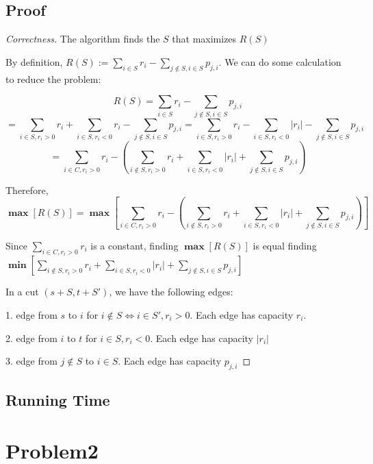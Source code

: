 \documentclass[openany]{article}
\begin{document}
\subsection*{Proof}
\begin{proof}[Correctness]{The algorithm finds the $S$ that maximizes $R(S)$}

By definition, $R(S):=\sum_{i\in S}r_i-\sum_{j\notin S, i\in S}p_{j,i}$. We can do some calculation to reduce the problem:

\[R(S) = \sum_{i\in S}r_i-\sum_{j\notin S, i\in S}p_{j,i}\]
\[= \sum_{i\in S, r_i>0}r_i + \sum_{i\in S, r_i<0}r_i - \sum_{j\notin S, i\in S}p_{j,i} = \sum_{i\in S, r_i>0}r_i - \sum_{i\in S, r_i<0}|r_i| - \sum_{j\notin S, i\in S}p_{j,i} \]
\[=\sum_{i\in C, r_i > 0}r_i - (\sum_{i\notin S, r_i>0}r_i + \sum_{i\in S, r_i<0}|r_i| + \sum_{j\notin S, i\in S}p_{j,i}) \]

Therefore, 
\[\mathbf{\max}[R(S)] =\mathbf{\max}[\sum_{i\in C, r_i > 0}r_i - (\sum_{i\notin S, r_i>0}r_i + \sum_{i\in S, r_i<0}|r_i| + \sum_{j\notin S, i\in S}p_{j,i})] \]

Since $\sum_{i\in C, r_i>0}r_i$ is a constant, finding $\mathbf{\max}[R(S)]$ is equal finding $\mathbf{\min}[\sum_{i\notin S, r_i>0}r_i + \sum_{i\in S, r_i<0}|r_i| + \sum_{j\notin S, i\in S}p_{j,i}]$

In a cut $(s+S, t+S')$, we have the following edges:

1. edge from $s$ to $i$ for $i\notin S \Leftrightarrow i\in S', r_i > 0$. Each edge has capacity $r_i$.

2. edge from $i$ to $t$ for $i\in S, r_i < 0$. Each edge has capacity $|r_i|$

3. edge from $j\notin S$ to $i\in S$. Each edge has capacity $p_{j,i}$
\end{proof}

\subsection*{Running Time}


\section*{Problem2}
\end{document}
